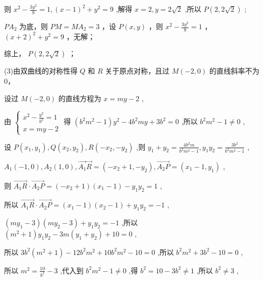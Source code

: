\documentclass[10pt]{article}
\newcommand*\circled[1]{\tikz[baseline=(char.base)]{\node[shape=circle,draw,inner sep=1.5pt] (char) {\small #1};}}
\begin{document}
则 \({x}^{2} - \frac{3{y}^{2}}{8} = 1,{\left( x - 1\right) }^{2} + {y}^{2} = 9\) ,解得 \(x = 2,y = 2\sqrt{2}\) ,所以 \(P\left( {2,2\sqrt{2}}\right)\) ;

 \circled{3}  \(P{A}_{2}\) 为底，则 \({PM} = M{A}_{2} = 3\) ，设 \(P\left( {x,y}\right)\) ，则 \({x}^{2} - \frac{3{y}^{2}}{8} = 1\) ， \({\left( x + 2\right) }^{2} + {y}^{2} = 9\) ，无解；

综上， \(P\left( {2,2\sqrt{2}}\right)\) ；

(3)由双曲线的对称性得 \(Q\) 和 \(R\) 关于原点对称，且过 \(M\left( {-2,0}\right)\) 的直线斜率不为0，

设过 \(M\left( {-2,0}\right)\) 的直线方程为 \(x = {my} - 2\) ,

由 \(\left\{  \begin{array}{l} {x}^{2} - \frac{{y}^{2}}{{b}^{2}} = 1 \\  x = {my} - 2 \end{array}\right.\) 得 \(\left( {{b}^{2}{m}^{2} - 1}\right) {y}^{2} - 4{b}^{2}{my} + 3{b}^{2} = 0\) ,所以 \({b}^{2}{m}^{2} - 1 \neq  0\) ,

设 \(P\left( {{x}_{1},{y}_{1}}\right) ,Q\left( {{x}_{2},{y}_{2}}\right) ,R\left( {-{x}_{2}, - {y}_{2}}\right)\) ,则 \({y}_{1} + {y}_{2} = \frac{4{b}^{2}m}{{b}^{2}{m}^{2} - 1},{y}_{1}{y}_{2} = \frac{3{b}^{2}}{{b}^{2}{m}^{2} - 1}\) ,

\({A}_{1}\left( {-1,0}\right) ,{A}_{2}\left( {1,0}\right) ,\overrightarrow{{A}_{1}}\overrightarrow{R} = \left( {-{x}_{2} + 1, - {y}_{2}}\right) ,\overrightarrow{{A}_{2}P} = \left( {{x}_{1} - 1,{y}_{1}}\right)\) ,

则 \(\overrightarrow{{A}_{1}R} \cdot  \overrightarrow{{A}_{2}P} = \left( {-{x}_{2} + 1}\right) \left( {{x}_{1} - 1}\right)  - {y}_{1}{y}_{2} = 1\) ,

所以 \(\overrightarrow{{A}_{1}R} \cdot  \overrightarrow{{A}_{2}P} = \left( {{x}_{1} - 1}\right) \left( {{x}_{2} - 1}\right)  + {y}_{1}{y}_{2} =  - 1\) ,

\(\left( {m{y}_{1} - 3}\right) \left( {m{y}_{2} - 3}\right)  + {y}_{1}{y}_{2} =  - 1\) ,所以 \(\left( {{m}^{2} + 1}\right) {y}_{1}{y}_{2} - {3m}\left( {{y}_{1} + {y}_{2}}\right)  + {10} = 0\) ,

所以 \(3{b}^{2}\left( {{m}^{2} + 1}\right)  - {12}{b}^{2}{m}^{2} + {10}{b}^{2}{m}^{2} - {10} = 0\) ,所以 \({b}^{2}{m}^{2} + 3{b}^{2} - {10} = 0\) ,

所以 \({m}^{2} = \frac{10}{{b}^{2}} - 3\) ,代入到 \({b}^{2}{m}^{2} - 1 \neq  0\) ,得 \({b}^{2} = {10} - 3{b}^{2} \neq  1\) ,所以 \({b}^{2} \neq  3\) ,
\end{document}
